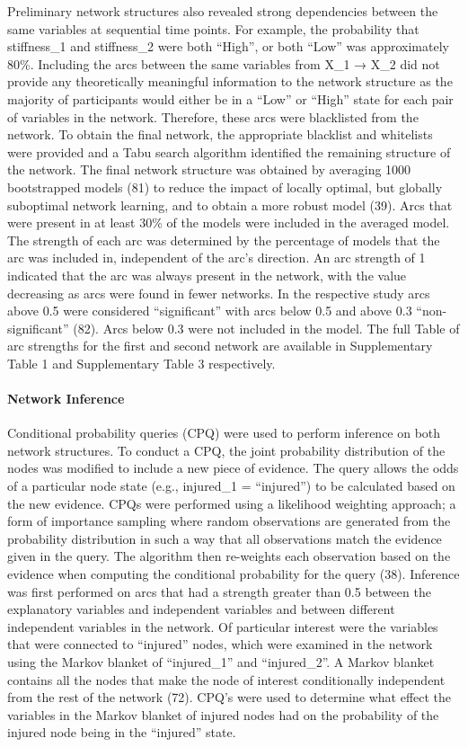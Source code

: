\documentclass[
  english,
  man]{apa6}
\let\oldparagraph\paragraph
\renewcommand{\paragraph}[1]{\oldparagraph{#1}\mbox{}}
\begin{document}
Preliminary network structures also revealed strong dependencies between the same variables at sequential time points. For example, the probability that stiffness\_1 and stiffness\_2 were both ``High'', or both ``Low'' was approximately 80\%. Including the arcs between the same variables from X\_1 → X\_2 did not provide any theoretically meaningful information to the network structure as the majority of participants would either be in a ``Low'' or ``High'' state for each pair of variables in the network. Therefore, these arcs were blacklisted from the network.
To obtain the final network, the appropriate blacklist and whitelists were provided and a Tabu search algorithm identified the remaining structure of the network.
The final network structure was obtained by averaging 1000 bootstrapped models (81) to reduce the impact of locally optimal, but globally suboptimal network learning, and to obtain a more robust model (39). Arcs that were present in at least 30\% of the models were included in the averaged model.
The strength of each arc was determined by the percentage of models that the arc was included in, independent of the arc's direction. An arc strength of 1 indicated that the arc was always present in the network, with the value decreasing as arcs were found in fewer networks. In the respective study arcs above 0.5 were considered ``significant'' with arcs below 0.5 and above 0.3 ``non-significant'' (82).
Arcs below 0.3 were not included in the model. The full Table of arc strengths for the first and second network are available in Supplementary Table 1 and Supplementary Table 3 respectively.

\hypertarget{network-inference}{%
\paragraph{Network Inference}\label{network-inference}}

Conditional probability queries (CPQ) were used to perform inference on both network structures. To conduct a CPQ, the joint probability distribution of the nodes was modified to include a new piece of evidence. The query allows the odds of a particular node state (e.g., injured\_1 = ``injured'') to be calculated based on the new evidence. CPQs were performed using a likelihood weighting approach; a form of importance sampling where random observations are generated from the probability distribution in such a way that all observations match the evidence given in the query. The algorithm then re-weights each observation based on the evidence when computing the conditional probability for the query (38). Inference was first performed on arcs that had a strength greater than 0.5 between the explanatory variables and independent variables and between different independent variables in the network. Of particular interest were the variables that were connected to ``injured'' nodes, which were examined in the network using the Markov blanket of ``injured\_1'' and ``injured\_2''. A Markov blanket contains all the nodes that make the node of interest conditionally independent from the rest of the network (72). CPQ's were used to determine what effect the variables in the Markov blanket of injured nodes had on the probability of the injured node being in the ``injured'' state.
\end{document}
